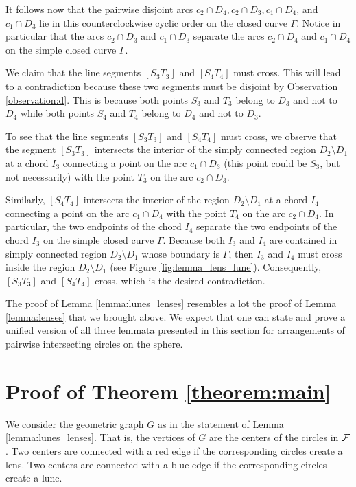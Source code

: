 \documentclass[11pt,a4paper]{article}
\newcommand{\F}{{\cal{F}}}
\newcommand{\bbox}{\vrule height7pt width4pt depth1pt}
\begin{document}
It follows now that the pairwise disjoint arcs $c_{2} \cap D_{4}, c_{2} \cap D_{3}, c_{1} \cap D_{4}$, and $c_{1} \cap D_{3}$ lie in this counterclockwise cyclic order on the closed curve $\Gamma$.
Notice in particular that the arcs $c_{2} \cap D_{3}$ and $c_{1} \cap D_{3}$ separate the arcs $c_{2} \cap D_{4}$ and $c_{1} \cap D_{4}$ on the simple closed curve $\Gamma$.

We claim that the line segments $[S_{3}T_{3}]$ and $[S_{4}T_{4}]$
must cross. This will lead to a contradiction 
because these two segments must be disjoint
by Observation \ref{observation:d}. This is because both points
$S_{3}$ and $T_{3}$ belong to $D_{3}$ and not to $D_{4}$ while both points $S_{4}$ and $T_{4}$
belong to $D_{4}$ and not to $D_{3}$.

To see that the line segments $[S_{3}T_{3}]$ and $[S_{4}T_{4}]$
must cross, we observe that the segment 
$[S_{3}T_{3}]$ intersects the interior of the simply connected region 
$D_{2} \setminus D_{1}$ at a chord $I_{3}$
connecting a point on the arc $c_{1} \cap D_{3}$ (this point could be $S_{3}$, but 
not necessarily) with the point $T_{3}$ on the arc $c_{2} \cap D_{3}$. 

Similarly, $[S_{4}T_{4}]$ intersects 
the interior of the region 
$D_{2} \setminus D_{1}$ at a chord $I_{4}$
connecting a point on the arc $c_{1} \cap D_{4}$ with the point $T_{4}$ on the arc
$c_{2} \cap D_{4}$. In particular, the two endpoints of the chord $I_{4}$
separate the two endpoints of the chord $I_{3}$ on the simple closed curve $\Gamma$.
Because both $I_{3}$ and $I_{4}$ are contained in simply connected region $D_{2} \setminus D_{1}$ whose boundary is $\Gamma$,
then $I_{3}$ and $I_{4}$
must cross inside the region $D_{2} \setminus
D_{1}$ (see Figure \ref{fig:lemma_lens_lune}). Consequently, $[S_{3}T_{3}]$ and $[S_{4}T_{4}]$ cross, which is the desired contradiction.
\bbox

\bigskip

The proof of Lemma \ref{lemma:lunes_lenses} resembles a lot the proof of Lemma \ref{lemma:lenses} that we brought above.
We expect that one can state and prove a unified version of all three lemmata presented in this section for arrangements of pairwise intersecting circles on the sphere. 

\section{Proof of Theorem \ref{theorem:main}}

We consider the geometric graph $G$ as in the statement of Lemma 
\ref{lemma:lunes_lenses}. That is, the vertices of $G$ are the centers of the circles in $\F$. Two centers are connected with a red edge if the corresponding circles
create a lens. Two centers are connected with a blue edge if the corresponding circles create a lune.
\end{document}
